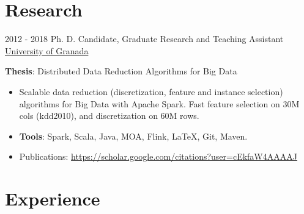 \documentclass[letterpaper]{twentysecondcv} %
\begin{document}
\section{Research}
\begin{twenty}
	\twentyitem
    	{2012 - 2018}
		{}
        {Ph. D. Candidate, Graduate Research and Teaching Assistant}
        {\href{http://www.ugr.es/}{University of Granada}}
        {}
        {
       	\textbf{Thesis}: Distributed Data Reduction Algorithms for Big Data
        {\begin{itemize}
        \item Scalable data reduction (discretization, feature and instance selection) algorithms for Big Data with Apache Spark. Fast feature selection on 30M cols (kdd2010), and discretization on 60M rows.
        \item \textbf{Tools}: Spark, Scala, Java, MOA, Flink, \LaTeX, Git, Maven.
        \item Publications: \url{https://scholar.google.com/citations?user=cEkfaW4AAAAJ}
		\end{itemize}}
        }
\end{twenty}


\section{Experience}
\end{document}
